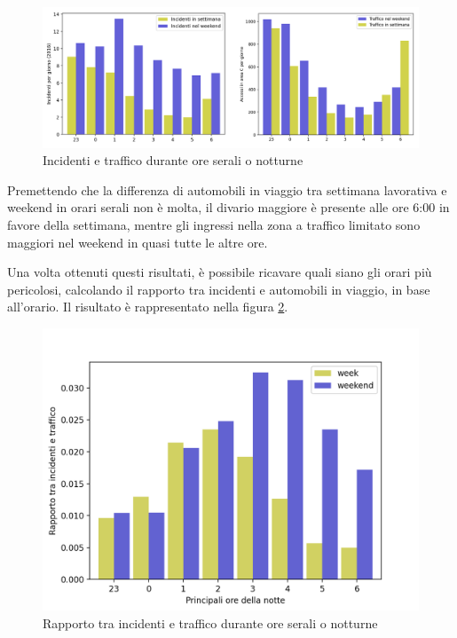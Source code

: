\documentclass[a4paper,12pt]{report}
\begin{document}
\begin{figure}
    \includegraphics[width=\linewidth]{img_unite/ore_punta.png}
    \caption{Incidenti e traffico durante ore serali o notturne}
    \label{fig:ore-notte}
\end{figure}

Premettendo che la differenza di automobili in viaggio tra settimana lavorativa e 
weekend in orari serali non è molta, il divario maggiore è presente alle ore 6:00 
in favore della settimana, mentre gli ingressi nella zona a traffico limitato 
sono maggiori nel weekend in quasi tutte le altre ore. 

Una volta ottenuti questi risultati, è possibile ricavare quali siano gli orari
più pericolosi, calcolando il rapporto tra incidenti e automobili in viaggio, 
in base all'orario. 
Il risultato è rappresentato nella figura \ref{fig:rapp-inc-traff}. 

\begin{figure}
    \includegraphics[width=\linewidth]{../src/area_c/rapporto_inc_notte.png}
    \caption{Rapporto tra incidenti e traffico durante ore serali o notturne}
    \label{fig:rapp-inc-traff}
\end{figure}
\end{document}
